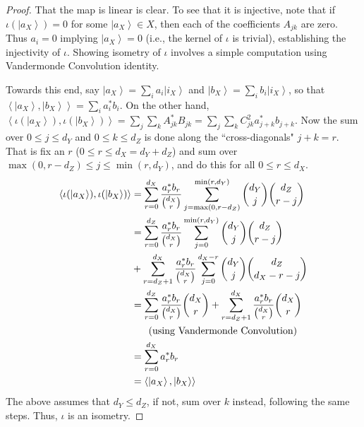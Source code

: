 \documentclass[pre,aps,showpacs,showkeys,twocolumn]{revtex4-1}
\newcommand\ip[1]{\left\langle#1\right\rangle}
\newcommand\ket[1]{\left|#1\right\rangle}
\theoremstyle{definition}
\theoremstyle{remark}
\begin{document}
\begin{proof}
    That the map is linear is clear. To see that it is injective, note that if $\iota(\ket{a_X}) = 0$ for some $\ket{a_X} \in X$, then each of the coefficients $A_{jk}$ are zero. Thus $a_i = 0$ implying $\ket{a_X} = 0$ (i.e., the kernel of $\iota$ is trivial), establishing the injectivity of $\iota$. Showing isometry of $\iota$ involves a simple computation using Vandermonde Convolution identity.

    Towards this end, say $\ket{a_X} = \sum_i a_i \ket{i_X}$ and $\ket{b_X} = \sum_i b_i \ket{i_X}$, so that $\ip{\ket{a_X}, \ket{b_X}} = \sum_i a_i^* b_i$. On the other hand, $\ip{\iota(\ket{a_X}), \iota(\ket{b_X})} = \sum_j \sum_k A_{jk}^* B_{jk} = \sum_j \sum_k C_{jk}^2 a_{j + k}^* b_{j + k}$. Now the sum over $0 \leq j \leq d_Y$ and $0 \leq k \leq d_Z$ is done along the ``cross-diagonals" $j + k = r$. That is fix an $r$ ($0 \leq r \leq d_X = d_Y + d_Z$) and sum over $\max(0, r - d_Z) \leq j \leq \min(r, d_Y)$, and do this for all $0 \leq r \leq d_X$.
    \begin{align*}
        \ip{\iota(\ket{a_X}), \iota(\ket{b_X})} &= \sum_{r = 0}^{d_X} \frac{a_r^* b_r}{\binom{d_X}{r}}
                                                        \sum_{j = \max(0, r - d_Z)}^{\min(r, d_Y)} \binom{d_Y}{j} \binom{d_Z}{r - j} \\
                                                &= \sum_{r = 0}^{d_Z} \frac{a_r^* b_r}{\binom{d_X}{r}}
                                                        \sum_{j = 0}^{\min(r, d_Y)} \binom{d_Y}{j} \binom{d_Z}{r - j} \\
                                                   &+ \sum_{r = d_Z + 1}^{d_X} \frac{a_r^* b_r}{\binom{d_X}{r}}
                                                            \sum_{j = 0}^{d_X - r} \binom{d_Y}{j} \binom{d_Z}{d_X - r - j} \\
                                                &= \sum_{r = 0}^{d_Z} \frac{a_r^* b_r}{\binom{d_X}{r}} \binom{d_X}{r} +
                                                   \sum_{r = d_Z + 1}^{d_X} \frac{a_r^* b_r}{\binom{d_X}{r}} \binom{d_X}{r} \\
                                                   &\hspace{0.5cm}\text{ (using Vandermonde Convolution) } \\
                                                &= \sum_{r = 0}^{d_X} a_r^* b_r \\
                                                &= \ip{\ket{a_X}, \ket{b_X}}
    \end{align*}
    The above assumes that $d_Y \leq d_Z$, if not, sum over $k$ instead, following the same steps. Thus, $\iota$ is an isometry.
\end{proof}
\end{document}
